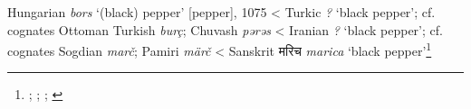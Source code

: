 \begin{etymology}\label{ety:bors}
Hungarian \textit{bors} `(black) pepper' [pepper], 1075
< Turkic \textit{?} `black pepper'; cf. cognates Ottoman Turkish \textit{burç}; Chuvash \textit{pərəs}
< Iranian \textit{?} `black pepper'; cf. cognates Sogdian \textit{marč}; Pamiri \textit{märč}
< Sanskrit {मरिच} \textit{marica} `black pepper'\footnote{\textcite{zaicz_etimologiai_2006}; \textcite{zaicz_etimologiai_2006}; \textcite{zaicz_etimologiai_2006}; \textcite[790]{monier-williams_sanskrit-english_1899}}
\end{etymology}